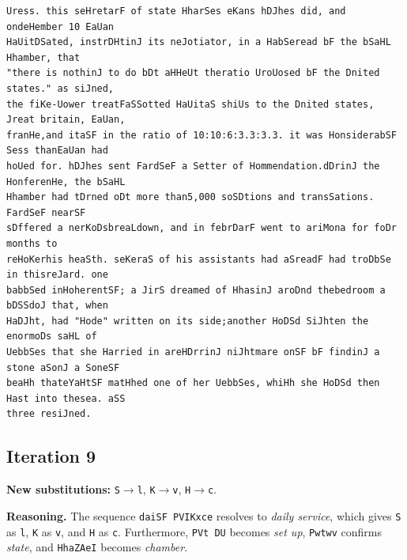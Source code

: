 \documentclass[11pt,a4paper]{article}
\begin{document}
\begin{lstlisting}[style=ciphertext,caption={Complete text after iteration 8}]
Uress. this seHretarF of state HharSes eKans hDJhes did, and ondeHember 10 EaUan
HaUitDSated, instrDHtinJ its neJotiator, in a HabSeread bF the bSaHL Hhamber, that
"there is nothinJ to do bDt aHHeUt theratio UroUosed bF the Dnited states." as siJned,
the fiKe-Uower treatFaSSotted HaUitaS shiUs to the Dnited states, Jreat britain, EaUan,
franHe,and itaSF in the ratio of 10:10:6:3.3:3.3. it was HonsiderabSF Sess thanEaUan had
hoUed for. hDJhes sent FardSeF a Setter of Hommendation.dDrinJ the HonferenHe, the bSaHL
Hhamber had tDrned oDt more than5,000 soSDtions and transSations. FardSeF nearSF
sDffered a nerKoDsbreaLdown, and in febrDarF went to ariMona for foDr months to
reHoKerhis heaSth. seKeraS of his assistants had aSreadF had troDbSe in thisreJard. one
babbSed inHoherentSF; a JirS dreamed of HhasinJ aroDnd thebedroom a bDSSdoJ that, when
HaDJht, had "Hode" written on its side;another HoDSd SiJhten the enormoDs saHL of
UebbSes that she Harried in areHDrrinJ niJhtmare onSF bF findinJ a stone aSonJ a SoneSF
beaHh thateYaHtSF matHhed one of her UebbSes, whiHh she HoDSd then Hast into thesea. aSS
three resiJned.
\end{lstlisting}

\newpage
\subsection{Iteration 9}

\noindent\textbf{New substitutions:} \texttt{S}$\rightarrow$\texttt{l}, \texttt{K}$\rightarrow$\texttt{v}, \texttt{H}$\rightarrow$\texttt{c}.\par
\smallskip
\noindent\textbf{Reasoning.} The sequence \texttt{daiSF PVIKxce} resolves to \textit{daily service}, which gives \texttt{S} as \texttt{l}, \texttt{K} as \texttt{v}, and \texttt{H} as \texttt{c}. Furthermore, \texttt{PVt DU} becomes \textit{set up}, \texttt{Pwtwv} confirms \textit{state}, and \texttt{HhaZAeI} becomes \textit{chamber}.
\end{document}
